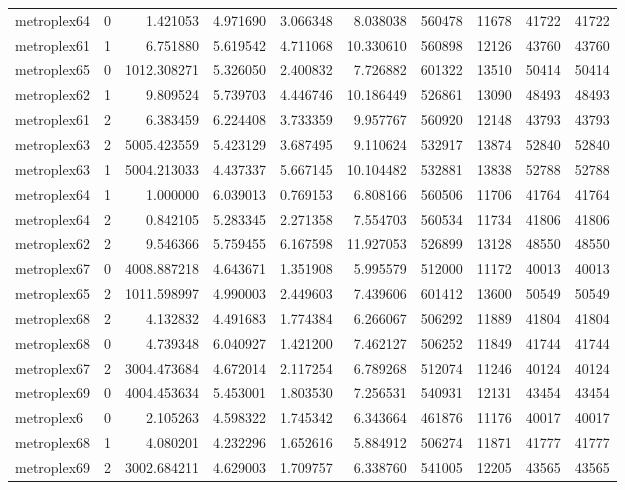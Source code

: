 \begin{longtable}{|l|r|r|r|r|r|r|r|r|r|}
metroplex64 & 0 & 1.421053 & 4.971690 & 3.066348 & 8.038038 & 560478 & 11678 & 41722 & 41722 \\
metroplex61 & 1 & 6.751880 & 5.619542 & 4.711068 & 10.330610 & 560898 & 12126 & 43760 & 43760 \\
metroplex65 & 0 & 1012.308271 & 5.326050 & 2.400832 & 7.726882 & 601322 & 13510 & 50414 & 50414 \\
metroplex62 & 1 & 9.809524 & 5.739703 & 4.446746 & 10.186449 & 526861 & 13090 & 48493 & 48493 \\
metroplex61 & 2 & 6.383459 & 6.224408 & 3.733359 & 9.957767 & 560920 & 12148 & 43793 & 43793 \\
metroplex63 & 2 & 5005.423559 & 5.423129 & 3.687495 & 9.110624 & 532917 & 13874 & 52840 & 52840 \\
metroplex63 & 1 & 5004.213033 & 4.437337 & 5.667145 & 10.104482 & 532881 & 13838 & 52788 & 52788 \\
metroplex64 & 1 & 1.000000 & 6.039013 & 0.769153 & 6.808166 & 560506 & 11706 & 41764 & 41764 \\
metroplex64 & 2 & 0.842105 & 5.283345 & 2.271358 & 7.554703 & 560534 & 11734 & 41806 & 41806 \\
metroplex62 & 2 & 9.546366 & 5.759455 & 6.167598 & 11.927053 & 526899 & 13128 & 48550 & 48550 \\
metroplex67 & 0 & 4008.887218 & 4.643671 & 1.351908 & 5.995579 & 512000 & 11172 & 40013 & 40013 \\
metroplex65 & 2 & 1011.598997 & 4.990003 & 2.449603 & 7.439606 & 601412 & 13600 & 50549 & 50549 \\
metroplex68 & 2 & 4.132832 & 4.491683 & 1.774384 & 6.266067 & 506292 & 11889 & 41804 & 41804 \\
metroplex68 & 0 & 4.739348 & 6.040927 & 1.421200 & 7.462127 & 506252 & 11849 & 41744 & 41744 \\
metroplex67 & 2 & 3004.473684 & 4.672014 & 2.117254 & 6.789268 & 512074 & 11246 & 40124 & 40124 \\
metroplex69 & 0 & 4004.453634 & 5.453001 & 1.803530 & 7.256531 & 540931 & 12131 & 43454 & 43454 \\
metroplex6 & 0 & 2.105263 & 4.598322 & 1.745342 & 6.343664 & 461876 & 11176 & 40017 & 40017 \\
metroplex68 & 1 & 4.080201 & 4.232296 & 1.652616 & 5.884912 & 506274 & 11871 & 41777 & 41777 \\
metroplex69 & 2 & 3002.684211 & 4.629003 & 1.709757 & 6.338760 & 541005 & 12205 & 43565 & 43565 \\

\end{longtable}
